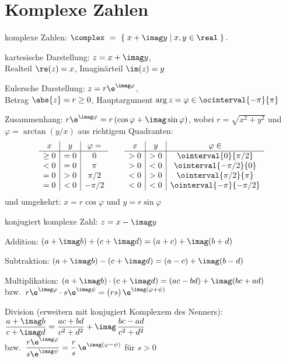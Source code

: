 \section{Komplexe Zahlen}

komplexe Zahlen:
\;$\displaystyle
\complex
\ =\ \{\;x+\imag y\;|\;x,y\in\real\;\}
\,.
$

kartesische Darstellung: $z=x+\imag y$,
\\
Realteil $\re(z)=x$, Imaginärteil $\im(z)=y$

Eulersche Darstellung: $z=r\e^{\imag\varphi}$,
\\
Betrag $\abs{z}=r\ge0$, Hauptargument $\arg{z}=\varphi\in\ocinterval{-\pi}{\pi}$

Zusammenhang: $r\e^{\imag\varphi}=r\,(\cos\varphi+\imag\sin\varphi)$, wobei $r=\sqrt{x^2+y^2}$ und $\varphi=\arctan(y/x)$ aus richtigem Quadranten:
\[
\begin{array}{c|c|c}
x & y & \varphi=\\
\hline
\ge0 & =0 & 0\\
<0 & =0 & \pi\\
=0 & >0 & \pi/2\\
=0 & <0 & -\pi/2
\end{array}
\qquad
\begin{array}{c|c|c}
x & y & \varphi\in\\
\hline
>0 & >0 & \ointerval{0}{\pi/2}\\
>0 & <0 & \ointerval{-\pi/2}{0}\\
<0 & >0 & \ointerval{\pi/2}{\pi}\\
<0 & <0 & \ointerval{-\pi}{-\pi/2}
\end{array}
\]
und umgekehrt: $x=r\cos\varphi$ und $y=r\sin\varphi$

konjugiert komplexe Zahl: $z=x-\imag y$

Addition: $(a+\imag b)+(c+\imag d)=(a+c)+\imag(b+d)$

Subtraktion: $(a+\imag b)-(c+\imag d)=(a-c)+\imag(b-d)$

Multiplikation: $(a+\imag b)\cdot(c+\imag d)=(ac-bd)+\imag(bc+ad)$
\\
bzw.\ $r\e^{\imag\varphi}\cdot{}s\e^{\imag\psi}=(rs)\,\e^{\imag(\varphi+\psi)}$

Division (erweitern mit konjugiert Komplexem des Nenners):
\\
$\displaystyle\frac{a+\imag b}{c+\imag d}
=\frac{ac+bd}{c^2+d^2}+\imag\,\frac{bc-ad}{c^2+d^2}$
\\
bzw.\ $\displaystyle\frac{r\e^{\imag\varphi}}{s\e^{\imag\psi}}
=\frac{r}{s}\,\e^{\imag(\varphi-\psi)}$ für $s>0$


